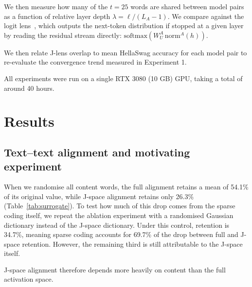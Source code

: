\documentclass{article}
\begin{document}
We then measure how many of the $t=25$ words are shared between model pairs as a function of relative layer depth $\lambda = \ell/(L_A-1)$. We compare against the logit lens~\citep{nostalgebraist2020logitlens}, which outputs the next-token distribution if stopped at a given layer by reading the residual stream directly:
$\mathrm{softmax}(W_U^A\,\mathrm{norm}^A(h))$. 

We then relate J-lens overlap to mean HellaSwag accuracy for each model pair to re-evaluate the convergence trend measured in Experiment 1.

All experiments were run on a single RTX 3080 (10 GB) GPU, taking a total of around 40 hours.
\section{Results}
\subsection{Text--text alignment and motivating experiment}
\label{sec:textresults}
When we randomise all content words, the full alignment retains a mean of 54.1\% of its original value, while J-space alignment retains only 26.3\% (Table~\ref{tab:surrogate}). To test how much of this drop comes from the sparse coding itself, we repeat the ablation experiment with a randomised Gaussian dictionary instead of the J-space dictionary. Under this control, retention is 34.7\%, meaning sparse coding accounts for 69.7\% of the drop between full and J-space retention. However, the remaining third is still attributable to the J-space itself. 

J-space alignment therefore depends more heavily on content than the full activation space.
\end{document}
